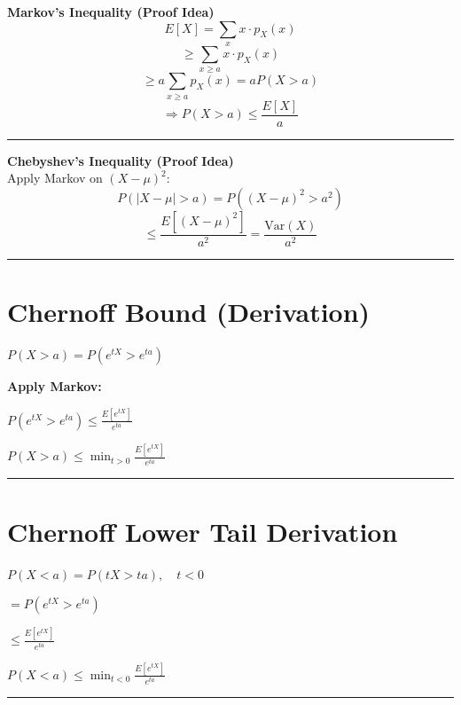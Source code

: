 \documentclass[12pt]{article}
\begin{document}
\textbf{Markov’s Inequality (Proof Idea)}
\[
E[X] = \sum_x x \cdot p_X(x)
\]
\[
\geq \sum_{x \geq a} x \cdot p_X(x)
\]
\[
\geq a \sum_{x \geq a} p_X(x) = a P(X > a)
\]
\[
\Rightarrow P(X > a) \leq \frac{E[X]}{a}
\]
\noindent\rule{\textwidth}{0.4pt}
\textbf{Chebyshev’s Inequality (Proof Idea)}
\\
Apply Markov on $(X - \mu)^2$:
\[
P(|X - \mu| > a) = P((X - \mu)^2 > a^2)
\]
\[
\leq \frac{E[(X - \mu)^2]}{a^2} = \frac{\mathrm{Var}(X)}{a^2}
\]
\noindent\rule{\textwidth}{0.4pt}
\section*{Chernoff Bound (Derivation)}

\begin{center}
    $P(X > a) = P(e^{tX} > e^{ta})$
\end{center}

\textbf{Apply Markov:}

\begin{center}
    $P(e^{tX} > e^{ta}) \leq \frac{E[e^{tX}]}{e^{ta}}$
\end{center}

\begin{center}
    $P(X > a) \leq \min_{t>0} \frac{E[e^{tX}]}{e^{ta}}$
\end{center}

\vspace{1em}
\hrule
\vspace{1em}

\section*{Chernoff Lower Tail Derivation}

\begin{center}
    $P(X < a) = P(tX > ta), \quad t < 0$
\end{center}

\begin{center}
    $= P(e^{tX} > e^{ta})$
\end{center}

\begin{center}
    $\leq \frac{E[e^{tX}]}{e^{ta}}$
\end{center}

\begin{center}
    $P(X < a) \leq \min_{t<0} \frac{E[e^{tX}]}{e^{ta}}$
\end{center}

\vspace{1em}
\hrule
\vspace{1em}
\end{document}
